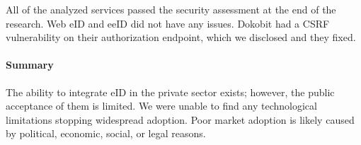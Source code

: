 All of the analyzed services passed the security assessment at the end of the research. Web eID and eeID did not have any issues. Dokobit had a CSRF vulnerability on their authorization endpoint, which we disclosed and they fixed.

\paragraph{Summary} The ability to integrate eID in the private sector exists; however, the public acceptance of them is limited. We were unable to find any technological limitations stopping widespread adoption. Poor market adoption is likely caused by political, economic, social, or legal reasons.